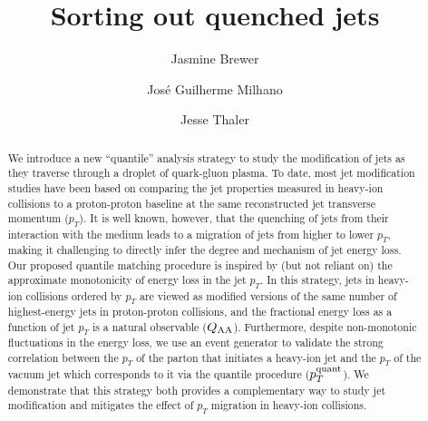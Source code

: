 \documentclass[aps,prl,twocolumn,preprintnumbers,superscriptaddress,showpacs,floatfix, nofootinbib]{revtex4-1}
\newcommand{\pTq}{p_T^{\rm quant}}
\begin{document}
 

\title{Sorting out quenched jets}

\author{Jasmine Brewer}

\author{Jos\'e Guilherme Milhano}

\author{Jesse Thaler}

\begin{abstract}
%
We introduce a new ``quantile'' analysis strategy to study the modification of jets as they traverse through a droplet of quark-gluon plasma.
%
To date, most jet modification studies have been based on comparing the jet properties measured in heavy-ion collisions to a proton-proton baseline at the same reconstructed jet transverse momentum ($p_T$).
%
It is well known, however, that the quenching of jets from their interaction with the medium leads to a migration of jets from higher to lower $p_T$, making it challenging to directly infer the degree and mechanism of jet energy loss.
%
Our proposed quantile matching procedure is inspired by (but not reliant on) the approximate monotonicity of energy loss in the jet $p_T$.
%
In this strategy, jets in heavy-ion collisions ordered by $p_T$ are viewed as modified versions of the same number of highest-energy jets in proton-proton collisions, and the fractional energy loss as a function of jet $p_T$ is a natural observable ($Q_{\rm AA}$).
%
Furthermore, despite non-monotonic fluctuations in the energy loss, we use an event generator to validate the strong correlation between the $p_T$ of the parton that initiates a heavy-ion jet and the $p_T$ of the vacuum jet which corresponds to it via the quantile procedure ($\pTq$).
%
We demonstrate that this strategy both provides a complementary way to study jet modification and mitigates the effect of $p_T$ migration in heavy-ion collisions.

\end{abstract}

\maketitle
\end{document}
